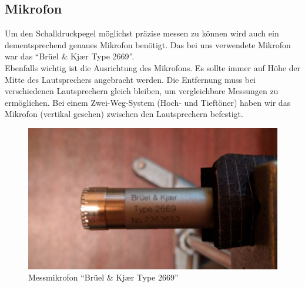 \newpage
\subsection{Mikrofon}\label{subsec:5.2.3}
Um den Schalldruckpegel möglichst präzise messen zu können wird auch ein dementsprechend genaues Mikrofon benötigt. Das bei uns verwendete Mikrofon war das \enquote{Brüel \& Kj\ae r Type 2669}. \\
Ebenfalls wichtig ist die Ausrichtung des Mikrofons. Es sollte immer auf Höhe der Mitte des Lautsprechers angebracht werden. Die Entfernung muss bei verschiedenen Lautsprechern gleich bleiben, um vergleichbare Messungen zu ermöglichen. Bei einem Zwei-Weg-System (Hoch- und Tieftöner) haben wir das Mikrofon (vertikal gesehen) zwischen den Lautsprechern befestigt.
\begin{figure} [H]
	\centering
	\includegraphics[width=1\textwidth]{img/LSMessung/mikro.png}
	\caption{Messmikrofon \enquote{Brüel \& Kj\ae r Type 2669}}
	\label{fig:5.2.3.1}
\end{figure}





